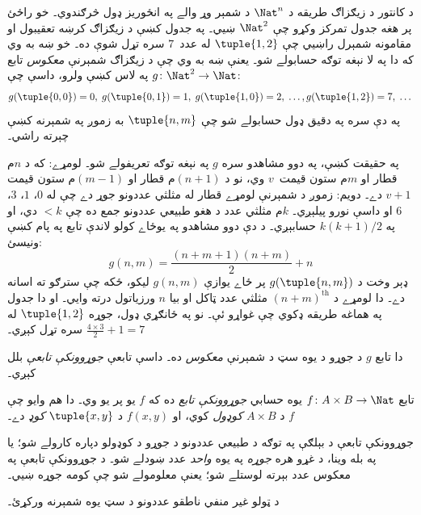 \documentclass[../../../include/open-logic-section]{subfiles}
\begin{document}

\begin{explain}
د کانتور د زيګزاګ طريقه د $\Nat^n$ د شمېر وړ والے په انځوريز
ډول څرګندوي۔ خو راځئ پر هغه جدول تمرکز وکړو چې $\Nat^2$ ښيي۔
په جدول کښې د زيګزاګ کرښه تعقيبول او مقامونه شمېرل راښيي چې
$\tuple{1,2}$ له عدد~$7$ سره تړل شوې ده۔ خو ښه به وي که دا
په لا نېغه توګه حسابولے شو۔ يعنې ښه به وي چې د زيګزاګ شمېرنې
\emph{معکوس} تابع $g\colon \Nat^2 \to \Nat$ په لاس کښې ولرو،
داسې چې:
\[
g(\tuple{0,0}) = 0, \;
g(\tuple{0,1}) = 1, \;
g(\tuple{1,0}) = 2, \; \dots,  
g(\tuple{1,2}) = 7, \; \dots
\]
په دې سره په دقيق ډول حسابولے شو چې $\tuple{n, m}$ به زموږ
په شمېرنه کښې چېرته راشي۔

په حقيقت کښې، په دوو مشاهدو سره $g$ په نېغه توګه تعريفولے شو۔
لومړے: که د $n$م قطار او $m$م ستون قيمت~$v$ وي، نو د
$(n+1)$م قطار او $(m-1)$م ستون قيمت $v + 1$ دے۔ دويم: زموږ
د شمېرنې لومړے قطار له مثلثي عددونو جوړ دے چې له $0$، $1$،
$3$، $6$ او داسې نورو پيلېږي۔ $k$م مثلثي عدد د هغو طبيعي
عددونو جمع ده چې $< k$ دي، او په $k(k+1)/2$ حسابېږي۔ د دې دوو
مشاهدو په يوځاے کولو لاندې تابع په پام کښې ونيسئ:
\[
  g(n,m) = \frac{(n+m+1)(n+m)}{2} + n
\]
ډېر وخت د $g(\tuple{n, m})$ پر ځاے يوازې $g(n, m)$ ليکو، ځکه
چې سترګو ته اسانه دے۔ دا لومړے د $(n+m)^\text{th}$ مثلثي عدد
ټاکل او بيا $n$ ورزياتول درته وايي۔ او دا جدول په هماغه طريقه
ډکوي چې غواړو ئې۔ نو په ځانګړي ډول، جوړه $\tuple{1, 2}$ له
$\frac{4 \times 3}{2} + 1 = 7$ سره تړل کېږي۔

دا تابع $g$ د جوړو د يوه سټ د شمېرنې \emph{معکوس} ده۔ داسې
تابعې \emph{جوړوونکې تابعې} بلل کېږي۔
\end{explain}

\begin{defn}
  تابع $f\colon A \times B \to \Nat$ يوه حسابي
  \emph{جوړوونکې تابع} ده که $f$ يو پر يو وي۔ دا هم وايو چې
  $f$ د $A \times B$ \emph{کوډول} کوي، او $f(x,y)$ د
  $\tuple{x,y}$ \emph{کوډ} دے۔
\end{defn}

\begin{explain}
جوړوونکې تابعې د بېلګې په توګه د طبيعي عددونو د جوړو د
کوډولو دپاره کارولے شو؛ يا په بله وينا، د غړو هره \emph{جوړه}
په يوه \emph{واحد} عدد ښودلے شو۔ د جوړوونکې تابعې په معکوس
عدد بېرته لوستلے شو؛ يعنې معلومولے شو چې کومه جوړه ښيي۔
\end{explain}

\begin{prob}
د ټولو غير منفي ناطقو عددونو د سټ يوه شمېرنه ورکړئ۔
\end{prob}
\end{document}
